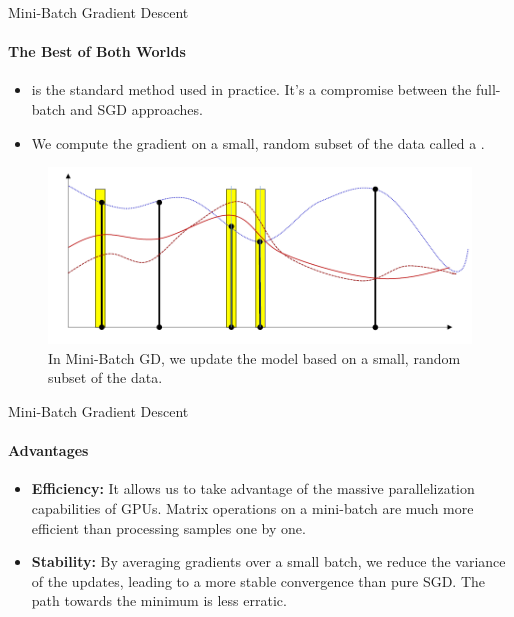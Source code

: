 \begin{frame}{Mini-Batch Gradient Descent}
    \framesubtitle{The Best of Both Worlds}
    \begin{itemize}
        \item {} is the standard method used in practice. It's a compromise between the full-batch and SGD approaches.
        \item We compute the gradient on a small, random subset of the data called a .
    \end{itemize}
    \begin{figure}
        \centering
        \includegraphics[width=0.7\linewidth]{images/minibatch_idea.png}
        \caption{In Mini-Batch GD, we update the model based on a small, random subset of the data.}
    \end{figure}
\end{frame}

\begin{frame}{Mini-Batch Gradient Descent}
    \framesubtitle{Advantages}
    \begin{itemize}
        \item \textbf{Efficiency:} It allows us to take advantage of the massive parallelization capabilities of GPUs. Matrix operations on a mini-batch are much more efficient than processing samples one by one.
        \item \textbf{Stability:} By averaging gradients over a small batch, we reduce the variance of the updates, leading to a more stable convergence than pure SGD. The path towards the minimum is less erratic.
    \end{itemize}
\end{frame}

